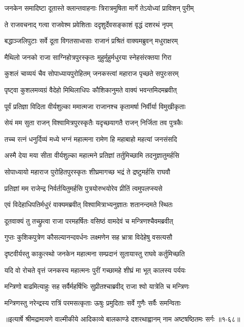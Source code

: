 
\twolineshloka
{जनकेन समादिष्टा दूतास्ते क्लान्तवाहनाः}
{त्रिरात्रमुषिता मार्गे तेऽयोध्यां प्राविशन् पुरीम्} %

\twolineshloka
{ते राजवचनाद् गत्वा राजवेश्म प्रवेशिताः}
{ददृशुर्देवसङ्काशं वृद्धं दशरथं नृपम्} %

\twolineshloka
{बद्धाञ्जलिपुटाः सर्वे दूता विगतसाध्वसाः}
{राजानं प्रश्रितं वाक्यमब्रुवन् मधुराक्षरम्} %

\twolineshloka
{मैथिलो जनको राजा साग्निहोत्रपुरस्कृतः}
{मुहुर्मुहुर्मधुरया स्नेहसंरक्तया गिरा} %

\twolineshloka
{कुशलं चाव्ययं चैव सोपाध्यायपुरोहितम्}
{जनकस्त्वां महाराज पृच्छते सपुरःसरम्} %

\twolineshloka
{पृष्ट्वा कुशलमव्यग्रं वैदेहो मिथिलाधिपः}
{कौशिकानुमते वाक्यं भवन्तमिदमब्रवीत्} %

\twolineshloka
{पूर्वं प्रतिज्ञा विदिता वीर्यशुल्का ममात्मजा}
{राजानश्च कृतामर्षा निर्वीर्या विमुखीकृताः} %

\twolineshloka
{सेयं मम सुता राजन् विश्वामित्रपुरस्कृतैः}
{यदृच्छयागतै राजन् निर्जिता तव पुत्रकैः} %

\twolineshloka
{तच्च रत्नं धनुर्दिव्यं मध्ये भग्नं महात्मना}
{रामेण हि महाबाहो महत्यां जनसंसदि} %

\twolineshloka
{अस्मै देया मया सीता वीर्यशुल्का महात्मने}
{प्रतिज्ञां तर्तुमिच्छामि तदनुज्ञातुमर्हसि} %

\twolineshloka
{सोपाध्यायो महाराज पुरोहितपुरस्कृतः}
{शीघ्रमागच्छ भद्रं ते द्रष्टुमर्हसि राघवौ} %

\twolineshloka
{प्रतिज्ञां मम राजेन्द्र निर्वर्तयितुमर्हसि}
{पुत्रयोरुभयोरेव प्रीतिं त्वमुपलप्स्यसे} %

\twolineshloka
{एवं विदेहाधिपतिर्मधुरं वाक्यमब्रवीत्}
{विश्वामित्राभ्यनुज्ञातः शतानन्दमते स्थितः} %

\twolineshloka
{दूतवाक्यं तु तच्छ्रुत्वा राजा परमहर्षितः}
{वसिष्ठं वामदेवं च मन्त्रिणश्चैवमब्रवीत्} %

\twolineshloka
{गुप्तः कुशिकपुत्रेण कौसल्यानन्दवर्धनः}
{लक्ष्मणेन सह भ्रात्रा विदेहेषु वसत्यसौ} %

\twolineshloka
{दृष्टवीर्यस्तु काकुत्स्थो जनकेन महात्मना}
{सम्प्रदानं सुतायास्तु राघवे कर्तुमिच्छति} %

\twolineshloka
{यदि वो रोचते वृत्तं जनकस्य महात्मनः}
{पुरीं गच्छामहे शीघ्रं मा भूत् कालस्य पर्ययः} %

\twolineshloka
{मन्त्रिणो बाढमित्याहुः सह सर्वैर्महर्षिभिः}
{सुप्रीतश्चाब्रवीद् राजा श्वो यात्रेति च मन्त्रिणः} %

\twolineshloka
{मन्त्रिणस्तु नरेन्द्रस्य रात्रिं परमसत्कृताः}
{ऊषुः प्रमुदिताः सर्वे गुणैः सर्वैः समन्विताः} %


॥इत्यार्षे श्रीमद्रामायणे वाल्मीकीये आदिकाव्ये बालकाण्डे दशरथाह्वानम् नाम अष्टषष्ठितमः सर्गः ॥१-६८॥
